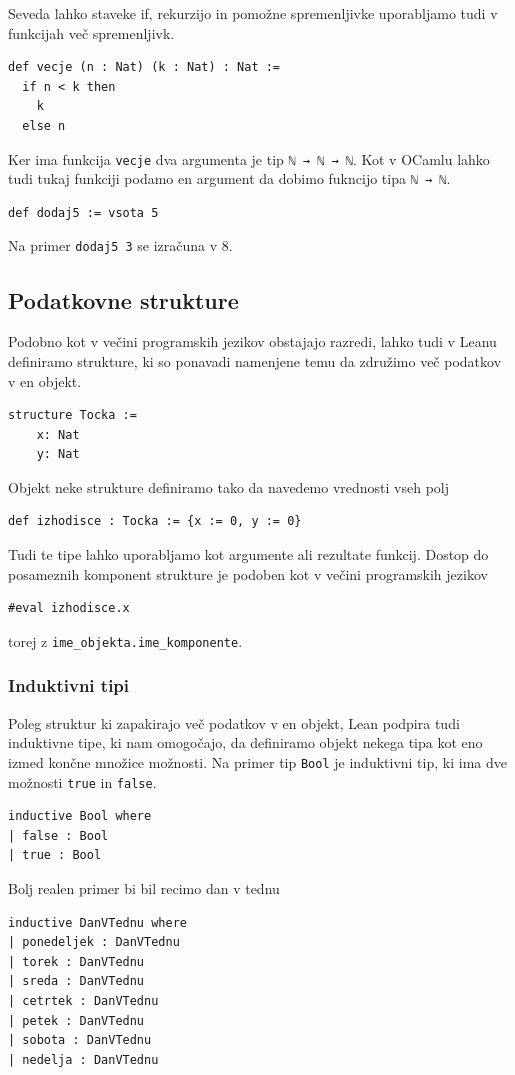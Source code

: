 \documentclass[mat1]{fmfdelo}
\begin{document}
Seveda lahko staveke if, rekurzijo in pomožne spremenljivke uporabljamo tudi v funkcijah več spremenljivk.
\begin{lstlisting}
def vecje (n : Nat) (k : Nat) : Nat :=
  if n < k then
    k
  else n
\end{lstlisting}
Ker ima funkcija \lstinline{vecje} dva argumenta je tip \lstinline{ℕ → ℕ → ℕ}. Kot v OCamlu lahko tudi tukaj funkciji podamo en argument 
da dobimo fukncijo tipa \lstinline{ℕ → ℕ}.
\begin{lstlisting}
def dodaj5 := vsota 5
\end{lstlisting}

Na primer \lstinline{dodaj5 3} se izračuna v 8.


\subsection{Podatkovne strukture}

Podobno kot v večini programskih jezikov obstajajo razredi, lahko tudi v Leanu definiramo strukture, ki so ponavadi namenjene temu da združimo več podatkov v en objekt.
\begin{lstlisting}
structure Tocka :=
    x: Nat
    y: Nat
\end{lstlisting}
Objekt neke strukture definiramo tako da navedemo vrednosti vseh polj
\begin{lstlisting}
def izhodisce : Tocka := {x := 0, y := 0}
\end{lstlisting}
Tudi te tipe lahko uporabljamo kot argumente ali rezultate funkcij.
Dostop do posameznih komponent strukture je podoben kot v večini programskih jezikov
\begin{lstlisting}
#eval izhodisce.x
\end{lstlisting}
torej z \lstinline{ime_objekta.ime_komponente}.

\subsubsection{Induktivni tipi}
Poleg struktur ki zapakirajo več podatkov v en objekt, Lean podpira tudi induktivne tipe, ki nam omogočajo, da definiramo objekt nekega tipa
kot eno izmed končne množice možnosti. Na primer tip \lstinline{Bool} je induktivni tip, ki ima dve možnosti \lstinline{true} in \lstinline{false}.
\begin{lstlisting}
inductive Bool where
| false : Bool
| true : Bool
\end{lstlisting}

Bolj realen primer bi bil recimo dan v tednu
\begin{lstlisting}
inductive DanVTednu where
| ponedeljek : DanVTednu
| torek : DanVTednu
| sreda : DanVTednu
| cetrtek : DanVTednu
| petek : DanVTednu
| sobota : DanVTednu
| nedelja : DanVTednu
\end{lstlisting}
\end{document}
